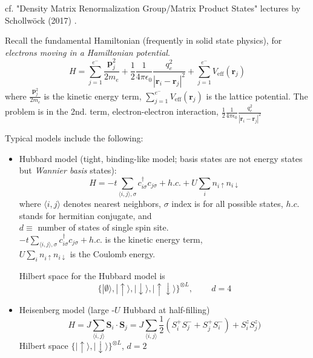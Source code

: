 \documentclass[10pt]{amsart}
\begin{document}
\begin{multicols*}{2}
cf. "Density Matrix Renormalization Group/Matrix Product States" lectures by Schollw\"{o}ck (2017) \cite{ArSo2017}.

Recall the fundamental Hamiltonian (frequently in solid state physics), for \emph{electrons moving in a Hamiltonian potential}. 
\begin{equation}
H = \sum_{j=1}^{ e^-} \frac{\mathbf{p}_j^2}{ 2m_e} + \frac{1}{2} \frac{1}{ 4\pi \epsilon_0} \frac{q_e^2}{ |\mathbf{r}_i - \mathbf{r}_j|^2 } + \sum_{j=1}^{e^-} V_{\text{eff}}(\mathbf{r}_j)
\end{equation}
where $\frac{\mathbf{p}_j^2}{ 2m_e}$ is the kinetic energy term, $\sum_{j=1}^{e^-} V_{\text{eff}}(\mathbf{r}_j)$ is the lattice potential.
The problem is in the 2nd. term, electron-electron interaction, $\frac{1}{2} \frac{1}{ 4\pi \epsilon_0} \frac{q_e^2}{ |\mathbf{r}_i - \mathbf{r}_j|^2 }$

Typical models include the following:

\begin{itemize}
	\item Hubbard model (tight, binding-like model; basis states are not energy states but \emph{Wannier basis} states):
	\begin{equation}
	H = -t \sum_{ \langle i, j \rangle, \sigma } c^{\dag}_{i \sigma} c_{j \sigma} + h.c. + U \sum_i n_{i \uparrow} n_{i \downarrow }
	\end{equation}
	where $\langle i, j \rangle$ denotes nearest neighbors, $\sigma$ index is for all possible states, $h.c.$ stands for hermitian conjugate, and \\
	$d \equiv$ number of states of single spin site. \\
	$-t \sum_{ \langle i, j \rangle, \sigma } c^{\dag}_{i \sigma} c_{j \sigma} + h.c.$ is the kinetic energy term, \\
	$U \sum_i n_{i \uparrow} n_{i \downarrow }$ is the Coulomb energy.
	
	Hilbert space for the Hubbard model is 
	\begin{equation}
	\lbrace | \emptyset \rangle , | \uparrow \rangle , | \downarrow \rangle , | \uparrow \downarrow \rangle \rbrace^{ \otimes L}, \qquad \, d = 4
	\end{equation}
	\item Heisenberg model (large -$U$ Hubbard at half-filling)
	\begin{equation}
	H = J \sum_{ \langle i , j \rangle } \mathbf{S}_i \cdot \mathbf{S}_j = J \sum_{ \langle i, j \rangle } \frac{1}{2} (S_i^{+} S_j^- + S_j^{+} S_i^-) + S_i^z S_j^z  )
	\end{equation}
	Hilbert space $\lbrace | \uparrow \rangle, | \downarrow \rangle \rbrace^{\otimes L}$, $d=2$ 
\end{itemize}


\end{multicols*}
\end{document}
